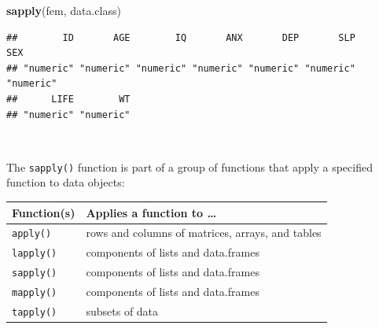 \documentclass[12pt,a4paper]{book}
\newenvironment{Shaded}{\begin{snugshade}}{\end{snugshade}}
\newcommand{\KeywordTok}[1]{\textcolor[rgb]{0.13,0.29,0.53}{\textbf{#1}}}
\newcommand{\NormalTok}[1]{#1}
\theoremstyle{definition}
\theoremstyle{definition}
\theoremstyle{definition}
\theoremstyle{remark}
\begin{document}
\begin{Shaded}
\begin{Highlighting}[]
\KeywordTok{sapply}\NormalTok{(fem, data.class)}
\end{Highlighting}
\end{Shaded}

\begin{verbatim}
##        ID       AGE        IQ       ANX       DEP       SLP       SEX 
## "numeric" "numeric" "numeric" "numeric" "numeric" "numeric" "numeric" 
##      LIFE        WT 
## "numeric" "numeric"
\end{verbatim}

~

The \texttt{sapply()} function is part of a group of functions that
apply a specified function to data objects:

\begin{longtable}[]{@{}ll@{}}
\toprule
\begin{minipage}[b]{0.27\columnwidth}\raggedright
\textbf{Function(s)}\strut
\end{minipage} & \begin{minipage}[b]{0.67\columnwidth}\raggedright
\textbf{Applies a function to \ldots{}}\strut
\end{minipage}\tabularnewline
\midrule
\endhead
\begin{minipage}[t]{0.27\columnwidth}\raggedright
\texttt{apply()}\strut
\end{minipage} & \begin{minipage}[t]{0.67\columnwidth}\raggedright
rows and columns of matrices, arrays, and tables\strut
\end{minipage}\tabularnewline
\begin{minipage}[t]{0.27\columnwidth}\raggedright
\texttt{lapply()}\strut
\end{minipage} & \begin{minipage}[t]{0.67\columnwidth}\raggedright
components of lists and data.frames\strut
\end{minipage}\tabularnewline
\begin{minipage}[t]{0.27\columnwidth}\raggedright
\texttt{sapply()}\strut
\end{minipage} & \begin{minipage}[t]{0.67\columnwidth}\raggedright
components of lists and data.frames\strut
\end{minipage}\tabularnewline
\begin{minipage}[t]{0.27\columnwidth}\raggedright
\texttt{mapply()}\strut
\end{minipage} & \begin{minipage}[t]{0.67\columnwidth}\raggedright
components of lists and data.frames\strut
\end{minipage}\tabularnewline
\begin{minipage}[t]{0.27\columnwidth}\raggedright
\texttt{tapply()}\strut
\end{minipage} & \begin{minipage}[t]{0.67\columnwidth}\raggedright
subsets of data\strut
\end{minipage}\tabularnewline
\bottomrule
\end{longtable}
\end{document}
